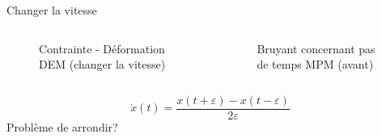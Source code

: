 \documentclass[10pt]{beamer}
\begin{document}
\begin{frame}{Changer la vitesse}
    \begin{columns}
        \begin{column}{0.5\textwidth}
            \begin{figure}[h]
                \centering
                \scalebox{0.5}{}
                \caption{Contrainte - Déformation DEM (changer la vitesse)}
            \end{figure}
        \end{column}
        \begin{column}{0.5\textwidth}
            \begin{figure}[h]
                \centering
                \scalebox{0.5}{}
                \caption{Bruyant concernant pas de temps MPM (avant)}
            \end{figure}
        \end{column}
    \end{columns}
    \[
        \dot{x}(t) = \frac{x(t+\varepsilon) - x(t-\varepsilon)}{2\varepsilon}
    \]
    Problème de arrondir?
\end{frame}

\end{document}
